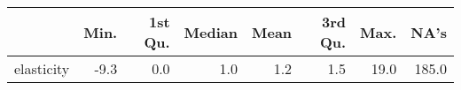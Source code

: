 \begin{table}[ht]
\centering
\begin{tabular}{rrrrrrrr}
  \hline
 & Min. & 1st Qu. & Median & Mean & 3rd Qu. & Max. & NA's \\ 
  \hline
elasticity & -9.3 & 0.0 & 1.0 & 1.2 & 1.5 & 19.0 & 185.0 \\ 
   \hline
\end{tabular}
\end{table}
